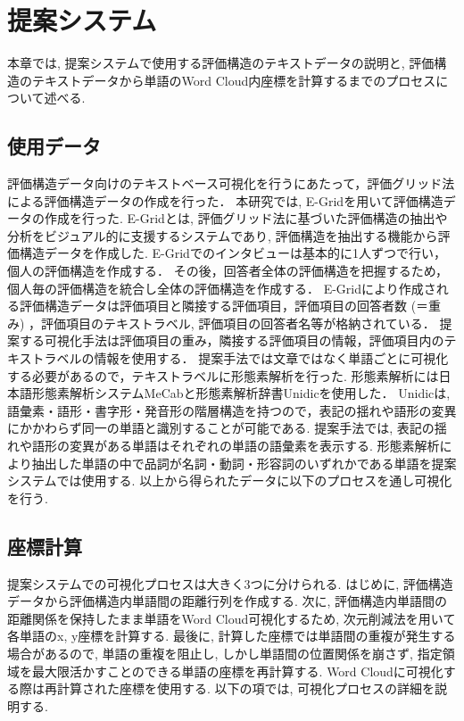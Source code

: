 \documentclass[syuuron]{kuee}
\begin{document}
\chapter{提案システム}
	本章では, 提案システムで使用する評価構造のテキストデータの説明と, 評価構造のテキストデータから単語のWord Cloud内座標を計算するまでのプロセスについて述べる. 
	
	\section{使用データ}
		評価構造データ向けのテキストベース可視化を行うにあたって，評価グリッド法による評価構造データの作成を行った．
		本研究では, E-Gridを用いて評価構造データの作成を行った. 
		E-Gridとは, 評価グリッド法に基づいた評価構造の抽出や分析をビジュアル的に支援するシステムであり, 
		評価構造を抽出する機能から評価構造データを作成した. 
		E-Gridでのインタビューは基本的に1人ずつで行い，個人の評価構造を作成する．
		その後，回答者全体の評価構造を把握するため，個人毎の評価構造を統合し全体の評価構造を作成する．
		E-Gridにより作成される評価構造データは評価項目と隣接する評価項目，評価項目の回答者数 (＝重み) ，評価項目のテキストラベル, 評価項目の回答者名等が格納されている．
		提案する可視化手法は評価項目の重み，隣接する評価項目の情報，評価項目内のテキストラベルの情報を使用する．
		提案手法では文章ではなく単語ごとに可視化する必要があるので，テキストラベルに形態素解析を行った. 
		形態素解析には日本語形態素解析システムMeCab\cite{mcb1}と形態素解析辞書Unidicを使用した．
		Unidicは, 語彙素・語形・書字形・発音形の階層構造を持つので，表記の揺れや語形の変異にかかわらず同一の単語と識別することが可能である. 
		提案手法では, 表記の揺れや語形の変異がある単語はそれぞれの単語の語彙素を表示する. 
		形態素解析により抽出した単語の中で品詞が名詞・動詞・形容詞のいずれかである単語を提案システムでは使用する. 
		以上から得られたデータに以下のプロセスを通し可視化を行う. 
		
	\section{座標計算}
		提案システムでの可視化プロセスは大きく3つに分けられる. 
		はじめに, 評価構造データから評価構造内単語間の距離行列を作成する. 
		次に, 評価構造内単語間の距離関係を保持したまま単語をWord Cloud可視化するため, 次元削減法を用いて各単語のx, y座標を計算する. 
		最後に, 計算した座標では単語間の重複が発生する場合があるので, 
		単語の重複を阻止し, しかし単語間の位置関係を崩さず, 指定領域を最大限活かすことのできる単語の座標を再計算する. 
		Word Cloudに可視化する際は再計算された座標を使用する. 
		以下の項では, 可視化プロセスの詳細を説明する. 
		
\end{document}

